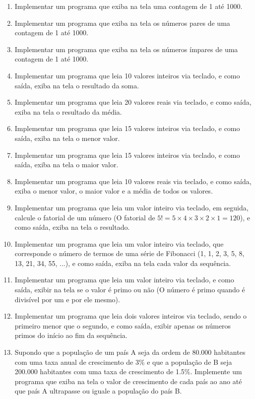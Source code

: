 \documentclass[11pt]{article}
\begin{document}
\begin{enumerate}
	\item  Implementar um programa que exiba na tela uma contagem de 1 até 1000.
	
	\item Implementar um programa que exiba na tela os números pares de uma contagem de 1 até 1000.
	
	\item Implementar um programa que exiba na tela os números ímpares de uma contagem de 1 até
	1000.
	
	\item Implementar um programa que leia 10 valores inteiros via teclado, e como saída, exiba na tela o
	resultado da soma.
	
	\item Implementar um programa que leia 20 valores reais via teclado, e como saída, exiba na tela o
	resultado da média.
	
	\item Implementar um programa que leia 15 valores inteiros via teclado, e como saída, exiba na tela o
	menor valor.
	
	\item  Implementar um programa que leia 15 valores inteiros via teclado, e como saída, exiba na tela o
	maior valor.
	
	\item Implementar um programa que leia 10 valores reais via teclado, e como saída, exiba o menor
	valor, o maior valor e a média de todos os valores.
	
	\item Implementar um programa que leia um valor inteiro via teclado, em seguida, calcule o fatorial de
	um número (O fatorial de $5! = 5 \times 4 \times 3 \times 2 \times 1 = 120$), e como saída, exiba na tela o resultado.
	
	\item  Implementar um programa que leia um valor inteiro via teclado, que corresponde o número de
	termos de uma série de Fibonacci (1, 1, 2, 3, 5, 8, 13, 21, 34, 55, ...), e como saída, exiba na tela
	cada valor da sequência.
	
	\item  Implementar um programa que leia um valor inteiro via teclado, e como saída, exibir na tela se
	o valor é primo ou não (O número é primo quando é divisível por um e por ele mesmo).
	
	\item  Implementar um programa que leia dois valores inteiros via teclado, sendo o primeiro menor que
	o segundo, e como saída, exibir apenas os números primos do início ao fim da sequência.
	
	\item Supondo que a população de um país A seja da ordem de 80.000 habitantes com uma taxa
	anual de crescimento de 3\% e que a população de B seja 200.000 habitantes com uma taxa de
	crescimento de 1.5\%. Implemente um programa que exiba na tela o valor de crescimento de cada
	país ao ano até que país A ultrapasse ou iguale a população do país B.
\end{enumerate}
\end{document}
